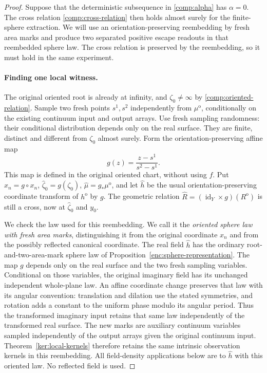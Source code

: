 \documentclass[11pt]{article}
\numberwithin{equation}{section}
\theoremstyle{definition}
\theoremstyle{remark}
\newcommand{\1}{\mathbf 1}
\DeclareMathOperator{\id}{id}
\begin{document}
\begin{proof}
Suppose that the deterministic subsequence in
\eqref{comp:alpha} has $\alpha=0$.  The cross relation
\eqref{comp:cross-relation} then holds almost surely for the
finite-sphere extraction.  We will use an orientation-preserving
reembedding by fresh area marks and produce two separated positive
escape readouts in that reembedded sphere law.  The cross relation
is preserved by the reembedding, so it must hold in the same
experiment.

\paragraph{Finding one local witness.}
The original oriented root is already at infinity, and
$\zeta_0\ne\infty$ by \eqref{comp:oriented-relation}.  Sample two
fresh points $s^1,s^2$ independently from $\mu^{\mathrm o}$,
conditionally on the existing continuum input and output arrays.
Use fresh sampling randomness: their conditional distribution depends
only on the real surface.  They are finite, distinct and different
from $\zeta_0$ almost surely.  Form the orientation-preserving affine
map
\[
 g(z)=\frac{z-s^1}{s^2-s^1}.
\]
This map is defined in the original oriented chart, without using $f$.
Put $\widehat x_n=g\circ x_n$, $\widehat\zeta_0=g(\zeta_0)$,
$\widehat\mu=g_*\mu^{\mathrm o}$, and let $\widehat h$ be the usual
orientation-preserving coordinate transform of $h^{\mathrm o}$ by
$g$.  The geometric relation
$\widehat R=(\id_Y\times g)(R^{\mathrm o})$ is still a cross, now
at $\widehat\zeta_0$ and $y_0$.

We check the law used for this reembedding.  We call it the
\emph{oriented sphere law with fresh area marks}, distinguishing it
from the original coordinate $x_n$ and from the possibly reflected
canonical coordinate.  The real field $\widehat h$ has the ordinary
root-and-two-area-mark sphere law of
Proposition~\ref{enc:sphere-representation}.  The map $g$ depends
only on the real surface and the two fresh sampling variables.
Conditional on those variables, the original imaginary field has
its unchanged independent whole-plane law.  An affine coordinate
change preserves that law with its angular convention: translation
and dilation use the stated symmetries, and rotation adds a constant
to the uniform phase modulo its angular period.  Thus the transformed
imaginary input retains that same law independently of the transformed
real surface.  The new marks are auxiliary continuum variables
sampled independently of the output arrays given the original
continuum input.  Theorem~\ref{ker:local-kernels} therefore retains
the same intrinsic observation kernels in this reembedding.  All
field-density applications below are to $\widehat h$ with this
oriented law.  No reflected field is used.


\end{proof}
\end{document}
